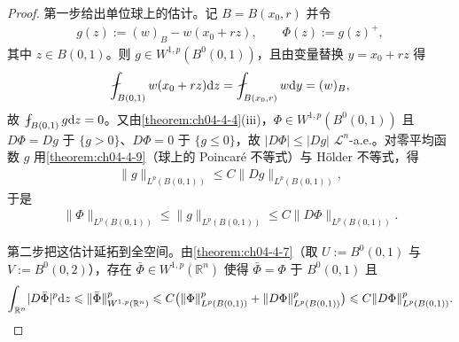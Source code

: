\documentclass[../../main.tex]{subfiles}%
\begin{document}
\begin{proof}
第一步给出单位球上的估计。记 $B=B(x_0,r)$ 并令
\begin{align*}
g(z):=(w)_B-w(x_0+rz),\qquad \Phi(z):=g(z)^+ ,
\end{align*}
其中 $z\in B(0,1)$。则 $g\in W^{1,p}(B^0(0,1))$，且由变量替换 $y=x_0+rz$ 得
\begin{align*}
\fint_{B(0,1)}w(x_0+rz)\diff z=\fint_{B(x_0,r)}w\diff y=(w)_B ,
\end{align*}
故 $\fint_{B(0,1)}g\diff z=0$。又由\cref{theorem:ch04-4-4}(iii)，$\Phi\in W^{1,p}(B^0(0,1))$ 且 $D\Phi=Dg$ 于 $\{g>0\}$、$D\Phi=0$ 于 $\{g\leqslant0\}$，故 $\lvert D\Phi\rvert\leqslant\lvert Dg\rvert$ $\mathcal{L}^n$-a.e.。对零平均函数 $g$ 用\cref{theorem:ch04-4-9}（球上的 Poincaré 不等式）与 Hölder 不等式，得 %
\begin{align*}
\lVert g\rVert_{L^p(B(0,1))}\leqslant C\lVert Dg\rVert_{L^p(B(0,1))},
\end{align*}
于是
\begin{align*}
\lVert\Phi\rVert_{L^p(B(0,1))}\leqslant\lVert g\rVert_{L^p(B(0,1))}\leqslant C\lVert D\Phi\rVert_{L^p(B(0,1))}.%
\end{align*}

第二步把这估计延拓到全空间。由\cref{theorem:ch04-4-7}（取 $U:=B^0(0,1)$ 与 $V:=B^0(0,2)$），存在 $\bar\Phi\in W^{1,p}(\mathbb{R}^n)$ 使得 $\bar\Phi=\Phi$ 于 $B^0(0,1)$ 且 %
\begin{align*}
\int_{\mathbb{R}^n}\lvert D\bar\Phi\rvert^p\diff z\leqslant\lVert\bar\Phi\rVert_{W^{1,p}(\mathbb{R}^n)}^p\leqslant C\bigl(\lVert\Phi\rVert_{L^p(B(0,1))}^p+\lVert D\Phi\rVert_{L^p(B(0,1))}^p\bigr)\leqslant C\lVert D\Phi\rVert_{L^p(B(0,1))}^p .%
\end{align*}


\end{proof}
\end{document}
